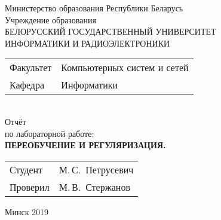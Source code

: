 \begin{titlepage}
  \begin{center}
    Министерство образования Республики Беларусь\\[1em]
    Учреждение образования\\
    БЕЛОРУССКИЙ ГОСУДАРСТВЕННЫЙ УНИВЕРСИТЕТ \\
    ИНФОРМАТИКИ И РАДИОЭЛЕКТРОНИКИ\\[1em]

    \begin{minipage}{\textwidth}
      \begin{flushleft}
        \begin{tabular}{ l l }
          Факультет & Компьютерных систем и сетей\\
          Кафедра   & Информатики
        \end{tabular}
      \end{flushleft}
    \end{minipage}\\[1em]


    {Отчёт}\\
    {по лабораторной работе:}\\[1em]
    \textbf{\large \MakeUppercase{Переобучение и регуляризация.}}\\[1em]


    \vfill
    \begin{tabular}{ p{}p{} }
      Студент & М.\,С.~Петрусевич \\
      Проверил & М.\,В.~Стержанов \\
    \end{tabular}
    
    \vfill
    {\normalsize Минск 2019}
  \end{center}
\end{titlepage}
